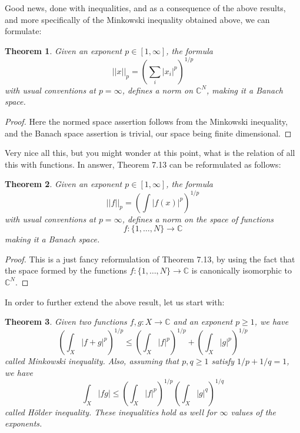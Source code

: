 \documentclass[12pt]{amsbook}
\newtheorem{theorem}{Theorem}[chapter]
\begin{document}
Good news, done with inequalities, and as a consequence of the above results, and more specifically of the Minkowski inequality obtained above, we can formulate:

\begin{theorem}
Given an exponent $p\in[1,\infty]$, the formula
$$||x||_p=\left(\sum_i|x_i|^p\right)^{1/p}$$
with usual conventions at $p=\infty$, defines a norm on $\mathbb C^N$, making it a Banach space.
\end{theorem}

\begin{proof}
Here the normed space assertion follows from the Minkowski inequality, and the Banach space assertion is trivial, our space being finite dimensional.
\end{proof}

Very nice all this, but you might wonder at this point, what is the relation of all this with functions. In answer, Theorem 7.13 can be reformulated as follows:

\begin{theorem}
Given an exponent $p\in[1,\infty]$, the formula
$$||f||_p=\left(\int|f(x)|^p\right)^{1/p}$$
with usual conventions at $p=\infty$, defines a norm on the space of functions 
$$f:\{1,\ldots,N\}\to\mathbb C$$
making it a Banach space.
\end{theorem}

\begin{proof}
This is a just fancy reformulation of Theorem 7.13, by using the fact that the space formed by the functions $f:\{1,\ldots,N\}\to\mathbb C$ is canonically isomorphic to $\mathbb C^N$.
\end{proof}

In order to further extend the above result, let us start with:

\begin{theorem}
Given two functions $f,g:X\to\mathbb C$ and an exponent $p\geq1$, we have
$$\left(\int_X|f+g|^p\right)^{1/p}\leq\left(\int_X|f|^p\right)^{1/p}+\left(\int_X|g|^p\right)^{1/p}$$
called Minkowski inequality. Also, assuming that $p,q\geq1$ satisfy $1/p+1/q=1$, we have
$$\int_X|fg|\leq \left(\int_X|f|^p\right)^{1/p}\left(\int_X|g|^q\right)^{1/q}$$
called H\"older inequality. These inequalities hold as well for $\infty$ values of the exponents.
\end{theorem}
\end{document}

